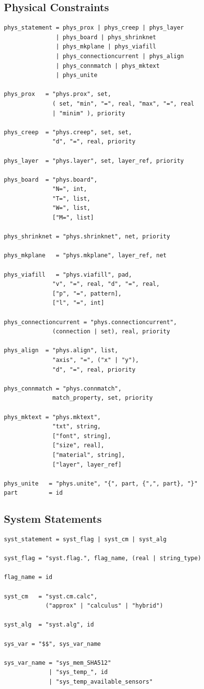 \subsection{Physical Constraints}
\begin{verbatim}
phys_statement = phys_prox | phys_creep | phys_layer
               | phys_board | phys_shrinknet
               | phys_mkplane | phys_viafill
               | phys_connectioncurrent | phys_align
               | phys_connmatch | phys_mktext
               | phys_unite

phys_prox   = "phys.prox", set,
              ( set, "min", "=", real, "max", "=", real
              | "minim" ), priority

phys_creep  = "phys.creep", set, set,
              "d", "=", real, priority

phys_layer  = "phys.layer", set, layer_ref, priority

phys_board  = "phys.board",
              "N=", int,
              "T=", list,
              "W=", list,
              ["M=", list]

phys_shrinknet = "phys.shrinknet", net, priority

phys_mkplane   = "phys.mkplane", layer_ref, net

phys_viafill   = "phys.viafill", pad,
              "v", "=", real, "d", "=", real,
              ["p", "=", pattern],
              ["l", "=", int]

phys_connectioncurrent = "phys.connectioncurrent",
              (connection | set), real, priority

phys_align  = "phys.align", list,
              "axis", "=", ("x" | "y"),
              "d", "=", real, priority

phys_connmatch = "phys.connmatch",
              match_property, set, priority

phys_mktext = "phys.mktext",
              "txt", string,
              ["font", string],
              ["size", real],
              ["material", string],
              ["layer", layer_ref]

phys_unite   = "phys.unite", "{", part, {",", part}, "}"
part         = id
\end{verbatim}

\subsection{System Statements}
\begin{verbatim}
syst_statement = syst_flag | syst_cm | syst_alg

syst_flag = "syst.flag.", flag_name, (real | string_type)

flag_name = id

syst_cm   = "syst.cm.calc",
            ("approx" | "calculus" | "hybrid")

syst_alg  = "syst.alg", id

sys_var = "$$", sys_var_name

sys_var_name = "sys_mem_SHA512"
             | "sys_temp_", id
             | "sys_temp_available_sensors"
\end{verbatim}

